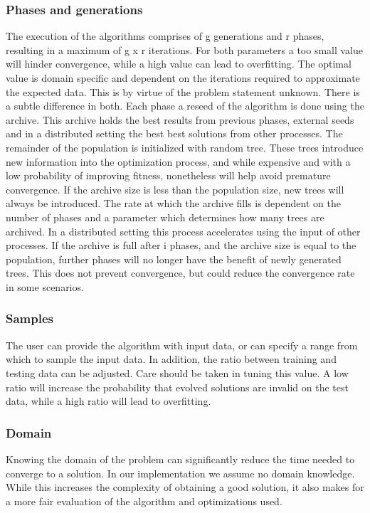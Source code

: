 \subsubsection{Phases and generations}
The execution of the algorithms comprises of g generations and r phases, resulting in a maximum of g x r iterations. 
For both parameters a too small value will hinder convergence, while a high value can lead to overfitting. The optimal value is domain specific and dependent on the iterations required to approximate the expected data. This is by virtue of the problem statement unknown. There is a subtle difference in both. Each phase a reseed of the algorithm is done using the archive. This archive holds the best results from previous phases, external seeds and in a distributed setting the best best solutions from other processes.
The remainder of the population is initialized with random tree. These trees introduce new information into the optimization process, and while expensive and with a low probability of improving fitness, nonetheless will help avoid premature convergence. 
If the archive size is less than the population size, new trees will always be introduced. The rate at which the archive fills is dependent on the number of phases and a parameter which determines how many trees are archived. In a distributed setting this process accelerates using the input of other processes. If the archive is full after i phases, and the archive size is equal to the population, further phases will no longer have the benefit of newly generated trees. This does not prevent convergence, but could reduce the convergence rate in some scenarios.

\subsubsection{Samples}
The user can provide the algorithm with input data, or can specify a range from which to sample the input data. In addition, the ratio between training and testing data can be adjusted. Care should be taken in tuning this value. A low ratio will increase the probability that evolved solutions are invalid on the test data, while a high ratio will lead to overfitting.

\subsubsection{Domain}
Knowing the domain of the problem can significantly reduce the time needed to converge to a solution. In our implementation we assume no domain knowledge. While this increases the complexity of obtaining a good solution, it also makes for a more fair evaluation of the algorithm and optimizations used. 


